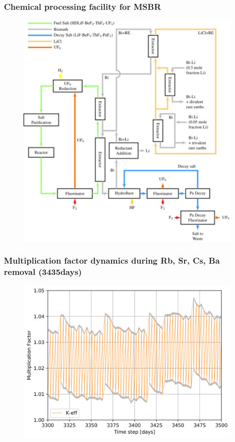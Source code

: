 \documentclass[9pt,handout]{beamer}
\begin{document}
\begin{frame}
  \frametitle{Chemical processing facility for \gls{MSBR}}
               \begin{figure}[t]
                \vspace*{-0.1in}
                \includegraphics[height=0.65\textwidth]{./images/flowsheet.pdf}
               \end{figure}
              
\end{frame}

\begin{frame}
  \frametitle{Multiplication factor dynamics during Rb, Sr, Cs, Ba removal (3435days)}
               \begin{figure}[t]
                \vspace*{-0.1in}
                \includegraphics[height=0.7\textwidth]{./images/keff_3435st.png}
               \end{figure}
              
\end{frame}
\end{document}
